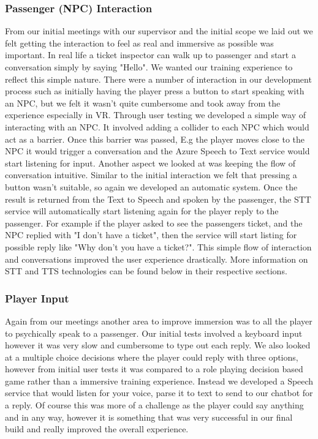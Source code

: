 \subsubsection{Passenger (NPC) Interaction}
From our initial meetings with our supervisor and the initial scope we laid out we felt getting the interaction to feel as real and immersive as possible was important. In real life a ticket inspector can walk up to passenger and start a conversation simply by saying "Hello". We wanted our training experience to reflect this simple nature. There were a number of interaction in our development process such as initially having the player press a button to start speaking with an NPC, but we felt it wasn't quite cumbersome and took away from the experience especially in VR. Through user testing we developed a simple way of interacting with an NPC. It involved adding a collider to each NPC which would act as a barrier. Once this barrier was passed, E.g the player moves close to the NPC it would trigger a conversation and the Azure Speech to Text service would start listening for input. Another aspect we looked at was keeping the flow of conversation intuitive. Similar to the initial interaction we felt that pressing a button wasn't suitable, so again we developed an automatic system. Once the result is returned from the Text to Speech and spoken by the passenger, the STT service will automatically start listening again for the player reply to the passenger. For example if the player asked to see the passengers ticket, and the NPC replied with "I don't have a ticket", then the service will start listing for possible reply like "Why don't you have a ticket?". This simple flow of interaction and conversations improved the user experience drastically. More information on STT and TTS technologies can be found below in their respective sections. 

\subsubsection{Player Input}
Again from our meetings another area to improve immersion was to all the player to psychically speak to a passenger. Our initial tests involved a keyboard input however it was very slow and cumbersome to type out each reply. We also looked at a multiple choice decisions where the player could reply with three options, however from initial user tests it was compared to a role playing decision based game rather than a immersive training experience. Instead we developed a Speech service that would listen for your voice, parse it to text to send to our chatbot for a reply. Of course this was more of a challenge as the player could say anything and in any way, however it is something that was very successful in our final build and really improved the overall experience.

